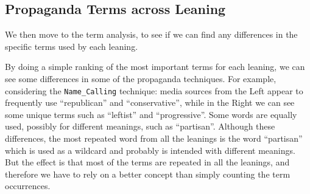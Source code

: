 \subsection{Propaganda Terms across Leaning}
We then move to the term analysis, to see if we can find any differences in the specific terms used by each leaning.




By doing a simple ranking of the most important terms for each leaning, we can see some differences in some of the propaganda techniques. For example, considering the \texttt{Name\_Calling} technique:
media sources from the Left appear to frequently use ``republican'' and ``conservative'', while in the Right we can see some unique terms such as ``leftist'' and ``progressive''. Some words are equally used, possibly for different meanings, such as ``partisan''.
Although these differences, the most repeated word from all the leanings is the word ``partisan'' which is used as a wildcard and probably is intended with different meanings.
But the effect is that most of the terms are repeated in all the leanings, and therefore we have to rely on a better concept than simply counting the term occurrences.


